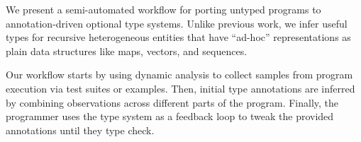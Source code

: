 %







We present a semi-automated workflow for porting
untyped programs to annotation-driven optional type systems.
Unlike previous work, we infer useful types for
recursive heterogeneous entities that have ``ad-hoc''
representations as plain data structures like maps, vectors, and sequences.

Our workflow starts by using dynamic analysis to collect samples from program execution
via test suites or examples.
Then, initial type annotations are inferred by
combining observations across different parts of the program.
Finally, the programmer uses the type system
as a feedback loop to tweak the provided annotations until they
type check.

